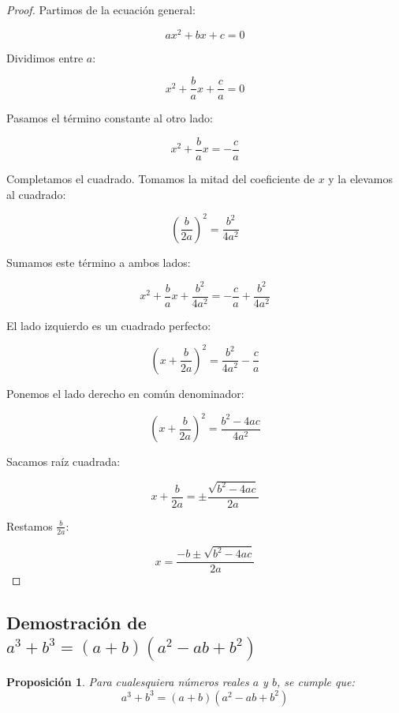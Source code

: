 \documentclass[12pt,final]{report}
\theoremstyle{plain}
\newtheorem{proposition}[theorem]{Proposición}
\theoremstyle{definition}
\begin{document}
\begin{proof}

Partimos de la ecuación general:

\[
ax^2 + bx + c = 0
\]

Dividimos entre $a$:

\[
x^2 + \frac{b}{a}x + \frac{c}{a} = 0
\]

Pasamos el término constante al otro lado:

\[
x^2 + \frac{b}{a}x = -\frac{c}{a}
\]

Completamos el cuadrado. Tomamos la mitad del coeficiente de $x$ y la elevamos al cuadrado:

\[
\left(\frac{b}{2a}\right)^2 = \frac{b^2}{4a^2}
\]

Sumamos este término a ambos lados:

\[
x^2 + \frac{b}{a}x + \frac{b^2}{4a^2} = -\frac{c}{a} + \frac{b^2}{4a^2}
\]

El lado izquierdo es un cuadrado perfecto:

\[
\left(x + \frac{b}{2a}\right)^2 = \frac{b^2}{4a^2} - \frac{c}{a}
\]

Ponemos el lado derecho en común denominador:

\[
\left(x + \frac{b}{2a}\right)^2 = \frac{b^2 - 4ac}{4a^2}
\]

Sacamos raíz cuadrada:

\[
x + \frac{b}{2a} = \pm \frac{\sqrt{b^2 - 4ac}}{2a}
\]

Restamos $\frac{b}{2a}$:

\[
x = \frac{-b \pm \sqrt{b^2 - 4ac}}{2a}
\]

\end{proof}
\newpage

\subsection{Demostración de $a^3 + b^3 = (a+b)(a^2 - ab + b^2)$}

\begin{proposition}
Para cualesquiera números reales $a$ y $b$, se cumple que:
\[
a^3 + b^3 = (a+b)(a^2 - ab + b^2)
\]
\end{proposition}
\end{document}
